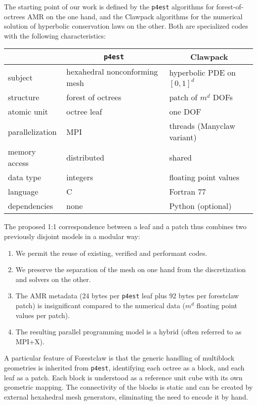 \documentclass{IOS-Book-Article}     %
\newcommand{\comment}[1]{\textcolor{green}{[DAC: #1]}\xspace}
\newcommand{\forestclaw}{Forestclaw\xspace}
\newcommand{\pforest}{\texttt{p4est}\xspace}
\begin{document}
The starting point of our work is defined by the \pforest algorithms for
forest-of-octrees AMR on the one hand, and the Clawpack algorithms for the
numerical solution of hyperbolic conservation laws
on the other.  Both are specialized codes with the following characteristics:
\begin{center}
\begin{tabular}{l|l|l}
& \multicolumn{1}{c|}{\pforest} & \multicolumn{1}{c}{Clawpack} \\
\hline
subject & hexahedral nonconforming mesh &  hyperbolic PDE on $[0, 1]^d$ \\
structure & forest of octrees & patch of $m^d$ DOFs \\
atomic unit & octree leaf & one DOF \\
parallelization & MPI & threads (Manyclaw variant) \\
memory access & distributed & shared \\
data type & integers & floating point values \\
language & C & Fortran 77 \\
dependencies & none & Python (optional) \\
\end{tabular}
\end{center}
The proposed 1:1 correspondence between a leaf and a patch thus combines two
previously disjoint models in a modular way:
\begin{enumerate}
\item We permit the reuse of existing, verified and performant codes.
\item We preserve the separation of the mesh on one hand from the
discretization and solvers on the other.
\item The AMR metadata (24 bytes per \pforest leaf plus 92 bytes per
forestclaw patch)
is insignificant compared to
the numerical data ($m^d$ floating point values per patch).
\item The resulting parallel programming model is a hybrid (often referred
to as MPI+X).
\end{enumerate}

A particular feature of \forestclaw is that the generic handling of multiblock
geometries is inherited from \pforest, identifying each octree as a block, and
each leaf as a patch.  Each block is understood as a reference unit cube with
its own geometric mapping.  The connectivity of the blocks is static and can be
created by external hexahedral mesh generators, eliminating the need to encode
it by hand.
\end{document}
